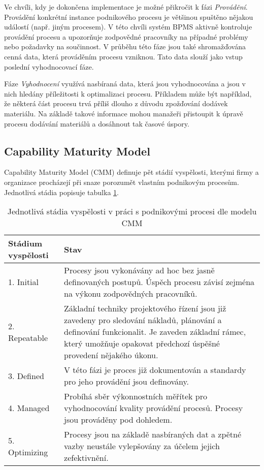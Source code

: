 \documentclass[]{article}
\begin{document}
Ve chvíli, kdy je dokončena implementace je možné přikročit k fázi \textit{Provádění}. Provádění konkrétní instance podnikového procesu je většinou spuštěno nějakou událostí (např. jiným procesem). V této chvíli systém BPMS aktivně kontroluje provádění procesu a upozorňuje zodpovědné pracovníky na případné problémy nebo požadavky na součinnost. V průběhu této fáze jsou také shromažďována cenná data, která prováděním procesu vzniknou. Tato data slouží jako vstup poslední vyhodnocovací fáze.

Fáze \textit{Vyhodnocení} využívá nasbíraná data, která jsou vyhodnocována a jsou v nich hledány příležitosti k optimalizaci procesu. Příkladem může být například, že některá část procesu trvá příliš dlouho z důvodu zpožďování dodávek materiálu. Na základě takové informace mohou manažeři přistoupit k úpravě procesu dodávání materiálů a dosáhnout tak časové úspory.

\subsection{Capability Maturity Model}
Capability Maturity Model (CMM) definuje pět stádií vyspělosti, kterými firmy a organizace procházejí při snaze porozumět vlastním podnikovým procesům. Jednotlivá stádia popisuje tabulka \ref{tab:cmm}.


\begin{table}[H]\centering
  \caption{Jednotlivá stádia vyspělosti v práci s podnikovými procesi dle modelu CMM \cite{Harmon2014}}
  \label{tab:cmm}
  \begin{tabular}{ | l | p{10cm} | }
    \hline
    \textbf{Stádium vyspělosti} & \textbf{Stav} \\ \hline\hline
    1. Initial & Procesy jsou vykonávány ad hoc bez jasně definovaných postupů. \newline Úspěch procesu závisí zejména na výkonu zodpovědných pracovníků. \\ \hline
    2. Repeatable & Základní techniky projektového řízení jsou již zavedeny pro sledování nákladů, plánování a definování funkcionalit. Je zaveden základní rámec, který umožňuje opakovat předchozí úspěšné provedení nějakého úkonu.  \\ \hline
    3. Defined & V této fázi je proces již dokumentován a standardy pro jeho provádění jsou definovány. \\ \hline
    4. Managed & Probíhá sběr výkonnostních měřítek pro vyhodnocování kvality provádění procesů. Procesy jsou prováděny pod dohledem.  \\ \hline
    5. Optimizing & Procesy jsou na základě nasbíraných dat a zpětné vazby neustále vylepšovány za účelem jejich zefektivnění.  \\
    \hline
  \end{tabular}
\end{table}
\end{document}
